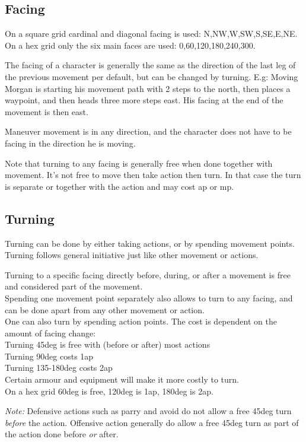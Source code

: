 \subsection*{Facing}
On a square grid cardinal and diagonal facing is used: N,NW,W,SW,S,SE,E,NE.
On a hex grid only the six main faces are used: 0,60,120,180,240,300.

The facing of a character is generally the same as the direction of the last leg of the previous movement per default, but can be changed by turning. E.g: Moving Morgan is starting his movement path with 2 steps to the north, then places a waypoint, and then heads three more steps east. His facing at the end of the movement is then east.

Maneuver movement is in any direction, and the character does not have to be facing in the direction he is moving.

Note that turning to any facing is generally free when done together with movement. It's not free to move then take action then turn. In that case the turn is separate or together with the action and may cost ap or mp.


\subsection*{Turning}
Turning can be done by either taking actions, or by spending movement points. Turning follows general initiative just like other movement or actions.

Turning to a specific facing directly before, during, or after a movement is free and considered part of the movement. \\
Spending one movement point separately also allows to turn to any facing, and can be done apart from any other movement or action. \\
One can also turn by spending action points. The cost is dependent on the amount of facing change: \\
Turning 45deg is free with (before or after) most actions \\
Turning 90deg costs 1ap \\
Turning 135-180deg costs 2ap \\
Certain armour and equipment will make it more costly to turn.\\
On a hex grid 60deg is free, 120deg is 1ap, 180deg is 2ap.

\emph{Note:} Defensive actions such as parry and avoid do not allow a free 45deg turn \emph{before} the action. Offensive action generally do allow a free 45deg turn as part of the action done before \emph{or} after.


